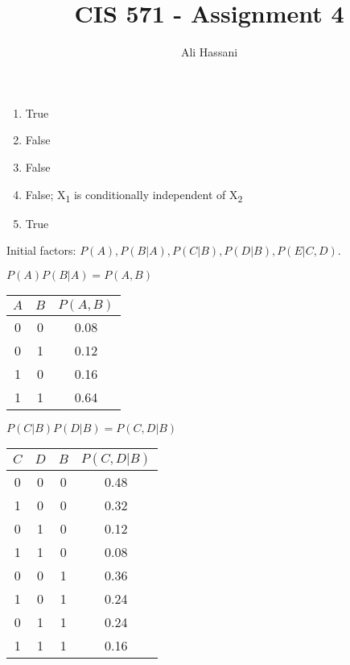 \documentclass{homework}
\title{CIS 571 - Assignment 4}
\author{Ali Hassani}
\begin{document}
\maketitle

\renewcommand{\theenumi}{\arabic{enumi}}
\renewcommand{\theenumii}{\roman{enumii}}

\exercise[1]
\begin{enumerate}
    \item True
    \item False
    \item False
    \item False; X\textsubscript{1} is conditionally independent of X\textsubscript{2}
    \item True
\end{enumerate}

\clearpage
\exercise[2]
Initial factors: $P(A), P(B | A), P(C | B), P(D | B), P(E | C, D).$

$P(A) P (B | A) = P(A, B)$

\begin{table}[h!]
    \centering
    \begin{tabular}{cc|c}
        $A$ & $B$ & $P(A, B)$ \\
        \midrule
        0 & 0 & 0.08 \\
        0 & 1 & 0.12 \\
        1 & 0 & 0.16 \\
        1 & 1 & 0.64 \\
    \end{tabular}
\end{table}

$P(C | B) P (D | B) = P(C, D | B)$

\begin{table}[h!]
    \centering
    \begin{tabular}{ccc|c}
        $C$ & $D$ & $B$ & $P(C, D | B)$ \\
        \midrule
        0 & 0 & 0 & 0.48 \\
        1 & 0 & 0 & 0.32 \\
        0 & 1 & 0 & 0.12 \\
        1 & 1 & 0 & 0.08 \\
        0 & 0 & 1 & 0.36 \\
        1 & 0 & 1 & 0.24 \\
        0 & 1 & 1 & 0.24 \\
        1 & 1 & 1 & 0.16 \\
    \end{tabular}
\end{table}
\end{document}

